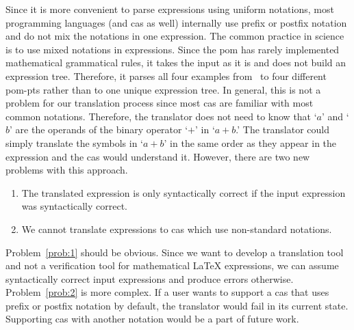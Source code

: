 \documentclass[a4paper,11pt]{article}
\theoremstyle{defTheoStyle}
\theoremstyle{defExampStyle}
\begin{document}
	Since it is more convenient to parse expressions using uniform notations, most programming 
	languages (and \gls*{cas} as well) internally use prefix or postfix notation and do not mix 
	the notations in one expression.
	The common practice in science is to use mixed notations in expressions. Since the \gls*{pom} has rarely implemented mathematical grammatical rules, it takes the input as it is and does not build an expression tree. Therefore, it parses all four examples from~ to four different \gls*{pom-pt}s rather than to one unique expression tree. In general, this is not a problem for our translation process since most \gls*{cas} are familiar with most common notations. Therefore, the translator does not need to know that `$a$' and `$b$' are the operands of the binary operator `$+$' in `$a+b$.' The translator could simply translate the symbols in `$a+b$' in the same order as they appear in the expression and the \gls*{cas} would understand it. However, there are two new problems with this approach.
	\begin{enumerate}\item \label{prob:1} The translated expression is only syntactically correct if the input expression was syntactically correct.
		\item \label{prob:2} We cannot translate expressions to \gls*{cas} which use non-standard notations.
	\end{enumerate}
	
	Problem~\ref{prob:1} should be obvious. Since we want to develop a translation tool and not a verification tool for mathematical \LaTeX{} expressions, we can assume syntactically correct input expressions and produce errors otherwise. Problem~\ref{prob:2} is more complex. If a user wants to support a \gls*{cas} that uses prefix or postfix notation by default, the translator would fail in its current state. Supporting \gls*{cas} with another notation would be a part of future work.
	
\end{document}
